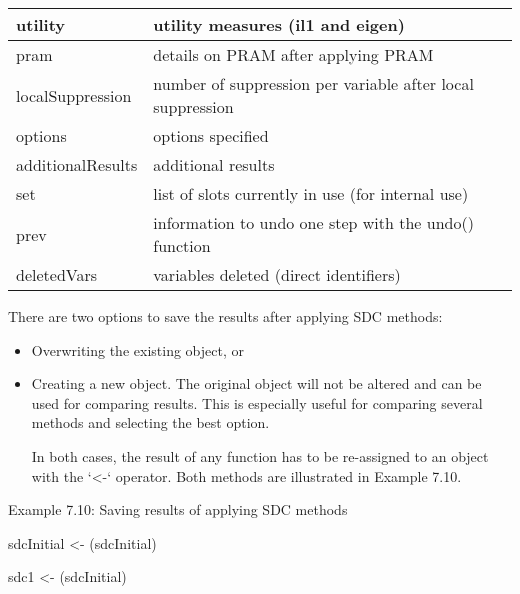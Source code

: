 \documentclass[letterpaper,10pt,english]{sphinxmanual}
\begin{document}
\begin{savenotes}
\begin{tabulary}{\linewidth}[t]{|T|T|}
\hline
utility
&
utility measures (il1 and eigen)
\\
\hline
pram
&
details on PRAM after applying
PRAM
\\
\hline
localSuppression
&
number of suppression per
variable after local suppression
\\
\hline
options
&
options specified
\\
\hline
additionalResults
&
additional results
\\
\hline
set
&
list of slots currently in use
(for internal use)
\\
\hline
prev
&
information to undo one step with
the undo() function
\\
\hline
deletedVars
&
variables deleted (direct
identifiers)
\\
\hline
\end{tabulary}
\par
\sphinxattableend\end{savenotes}

There are two options to save the results after applying SDC methods:
\begin{itemize}
\item {} 
Overwriting the existing  object, or

\item {} 
Creating a new  object. The original object will not be
altered and can be used for comparing results. This is especially
useful for comparing several methods and selecting the best option.

In both cases, the result of any function has to be re-assigned to an
object with the ‘\textless{}-‘ operator. Both methods are illustrated in
Example 7.10.

\end{itemize}

Example 7.10: Saving results of applying SDC methods

\begin{DUlineblock}{0em}
\item[] 
\item[] sdcInitial \textless{}- (sdcInitial)
\end{DUlineblock}

\begin{DUlineblock}{0em}
\item[] 
\item[] sdc1 \textless{}- (sdcInitial)
\end{DUlineblock}
\end{document}
